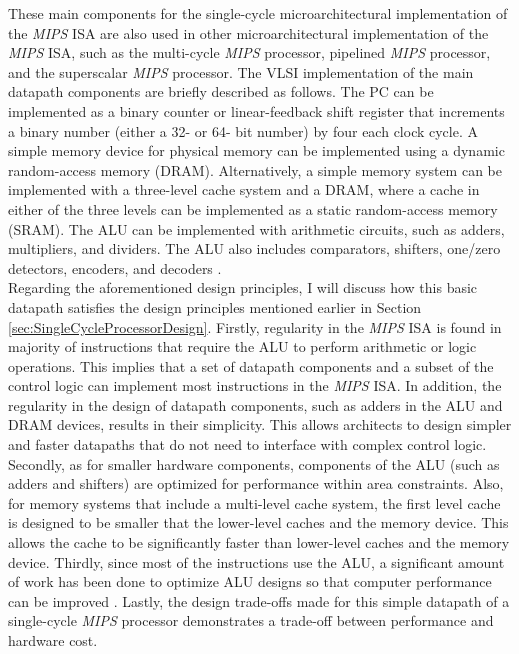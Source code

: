 These main components for the single-cycle microarchitectural implementation of the {\it MIPS} ISA are also used in other microarchitectural implementation of the {\it MIPS} ISA, such as the multi-cycle {\it MIPS} processor, pipelined {\it MIPS} processor, and the superscalar {\it MIPS} processor. The VLSI implementation of the main datapath components are briefly described as follows. The PC can be implemented as a binary counter or linear-feedback shift register that increments a binary number (either a 32- or 64- bit number) by four each clock cycle. A simple memory device for physical memory can be implemented using a dynamic random-access memory (DRAM). Alternatively, a simple memory system can be implemented with a three-level cache system and a DRAM, where a cache in either of the three levels can be implemented as a static random-access memory (SRAM). The ALU can be implemented with arithmetic circuits, such as adders, multipliers, and dividers. The ALU also includes comparators, shifters, one/zero detectors, encoders, and decoders \cite{Weste2011}. \\

Regarding the aforementioned design principles, I will discuss how this basic datapath satisfies the design principles mentioned earlier in Section \ref{sec:SingleCycleProcessorDesign}. Firstly, regularity in the {\it MIPS} ISA is found in majority of instructions that require the ALU to perform arithmetic or logic operations. This implies that a set of datapath components and a subset of the control logic can implement most instructions in the {\it MIPS} ISA. In addition, the regularity in the design of datapath components, such as adders in the ALU and DRAM devices, results in their simplicity. This allows architects to design simpler and faster datapaths that do not need to interface with complex control logic.  Secondly, as for smaller hardware components, components of the ALU (such as adders and shifters) are optimized for performance within area constraints. Also, for memory systems that include a multi-level cache system, the first level cache is designed to be smaller that the lower-level caches and the memory device. This allows the cache to be significantly faster than lower-level caches and the memory device. Thirdly, since most of the instructions use the ALU, a significant amount of work has been done to optimize ALU designs so that computer performance can be improved \cite{Ercegovac2004,Parhami2010,Stine2004,Farhat2004}. Lastly, the design trade-offs made for this simple datapath of a single-cycle {\it MIPS} processor demonstrates a trade-off between performance and hardware cost.




